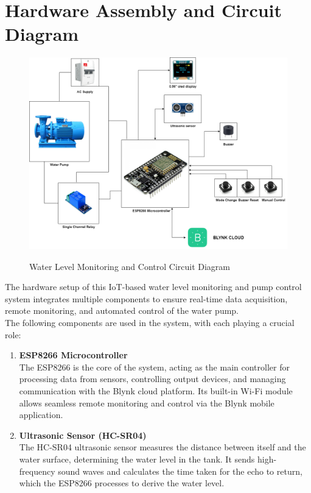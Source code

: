 \section{Hardware Assembly and Circuit Diagram}
{\fontsize{12}{14}\selectfont
        \begin{figure}[H]
            \centering
            \includegraphics[width=6in]{diagram.png} \\
            \caption{Water Level Monitoring and Control Circuit Diagram}
            \label{fig:diagram} %
        \end{figure}

The hardware setup of this IoT-based water level monitoring and pump control system integrates multiple components to ensure real-time data acquisition, remote monitoring, and automated control of the water pump. \\
\newpage
\noindent
The following components are used in the system, with each playing a crucial role: \\
\begin{enumerate}
  \item \textbf{ESP8266 Microcontroller}\\
The ESP8266 is the core of the system, acting as the main controller for processing data from sensors, controlling output devices, and managing communication with the Blynk cloud platform. Its built-in Wi-Fi module allows seamless remote monitoring and control via the Blynk mobile application.

  \item \textbf{Ultrasonic Sensor (HC-SR04)}\\
The HC-SR04 ultrasonic sensor measures the distance between itself and the water surface, determining the water level in the tank. It sends high-frequency sound waves and calculates the time taken for the echo to return, which the ESP8266 processes to derive the water level.
  

\end{enumerate}}
